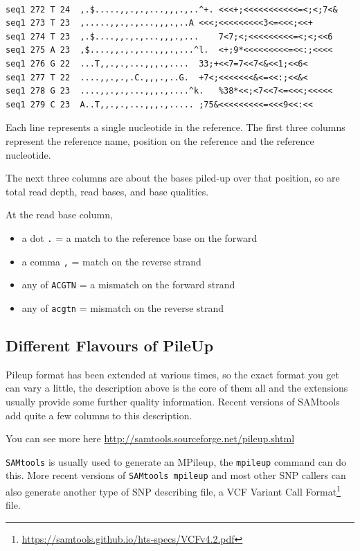 \documentclass[12pt,]{book}
\providecommand{\tightlist}{%
  \setlength{\itemsep}{0pt}\setlength{\parskip}{0pt}}
\let\rmarkdownfootnote\footnote%
\def\footnote{\protect\rmarkdownfootnote}
\renewcommand{\href}[2]{#2\footnote{\url{#1}}}
\begin{document}
\begin{verbatim}

seq1 272 T 24  ,.$.....,,.,.,...,,,.,..^+. <<<+;<<<<<<<<<<<=<;<;7<&
seq1 273 T 23  ,.....,,.,.,...,,,.,..A <<<;<<<<<<<<<3<=<<<;<<+
seq1 274 T 23  ,.$....,,.,.,...,,,.,...    7<7;<;<<<<<<<<<=<;<;<<6
seq1 275 A 23  ,$....,,.,.,...,,,.,...^l.  <+;9*<<<<<<<<<=<<:;<<<<
seq1 276 G 22  ...T,,.,.,...,,,.,....  33;+<<7=7<<7<&<<1;<<6<
seq1 277 T 22  ....,,.,.,.C.,,,.,..G.  +7<;<<<<<<<&<=<<:;<<&<
seq1 278 G 23  ....,,.,.,...,,,.,....^k.   %38*<<;<7<<7<=<<<;<<<<<
seq1 279 C 23  A..T,,.,.,...,,,.,..... ;75&<<<<<<<<<=<<<9<<:<<
\end{verbatim}

Each line represents a single nucleotide in the reference. The first
three columns represent the reference name, position on the reference
and the reference nucleotide.

The next three columns are about the bases piled-up over that position,
so are total read depth, read bases, and base qualities.

At the read base column,

\begin{itemize}
\tightlist
\item
  a dot \texttt{.} = a match to the reference base on the forward
\item
  a comma \texttt{,} = match on the reverse strand
\item
  any of \texttt{ACGTN} = a mismatch on the forward strand
\item
  any of \texttt{acgtn} = mismatch on the reverse strand
\end{itemize}

\subsection{Different Flavours of
PileUp}\label{different-flavours-of-pileup}

Pileup format has been extended at various times, so the exact format
you get can vary a little, the description above is the core of them all
and the extensions usually provide some further quality information.
Recent versions of SAMtools add quite a few columns to this description.

You can see more here \url{http://samtools.sourceforge.net/pileup.shtml}

\texttt{SAMtools} is usually used to generate an MPileup, the
\texttt{mpileup} command can do this. More recent versions of
\texttt{SAMtools\ mpileup} and most other SNP callers can also generate
another type of SNP describing file, a VCF
\href{https://samtools.github.io/hts-specs/VCFv4.2.pdf}{Variant Call
Format} file.
\end{document}
